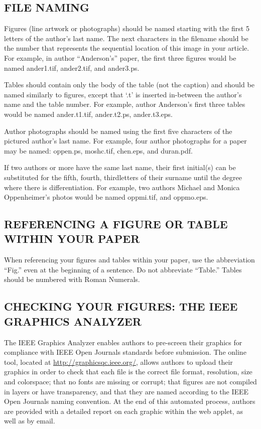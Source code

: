 \documentclass{IEEEoj}
\begin{document}
\subsection{FILE NAMING}
Figures (line artwork or photographs) should be named starting with the 
first 5 letters of the author's last name. The next characters in the 
filename should be the number that represents the sequential location of 
this image in your article. For example, in author ``Anderson's'' paper, the 
first three figures would be named ander1.tif, ander2.tif, and ander3.ps.

Tables should contain only the body of the table (not the caption) and 
should be named similarly to figures, except that `.t' is inserted 
in-between the author's name and the table number. For example, author 
Anderson's first three tables would be named ander.t1.tif, ander.t2.ps, 
ander.t3.eps.

Author photographs should be named using the first five characters of the 
pictured author's last name. For example, four author photographs for a 
paper may be named: oppen.ps, moshc.tif, chen.eps, and duran.pdf.

If two authors or more have the same last name, their first initial(s) can 
be substituted for the fifth, fourth, third\textellipsis letters of their surname 
until the degree where there is differentiation. For example, two authors 
Michael and Monica Oppenheimer's photos would be named oppmi.tif, and 
oppmo.eps.

\subsection{REFERENCING A FIGURE OR TABLE WITHIN YOUR PAPER}
When referencing your figures and tables within your paper, use the 
abbreviation ``Fig.'' even at the beginning of a sentence. Do not abbreviate 
``Table.'' Tables should be numbered with Roman Numerals.

\subsection{CHECKING YOUR FIGURES: THE IEEE GRAPHICS ANALYZER}
The IEEE Graphics Analyzer enables authors to pre-screen their graphics for 
compliance with IEEE Open Journals standards before submission. The online 
tool, located at \underline {http://graphicsqc.ieee.org/}, allows authors to 
upload their graphics in order to check that each file is the correct file 
format, resolution, size and colorspace; that no fonts are missing or 
corrupt; that figures are not compiled in layers or have transparency, and 
that they are named according to the IEEE Open Journals naming convention. 
At the end of this automated process, authors are provided with a detailed 
report on each graphic within the web applet, as well as by email.
\end{document}
